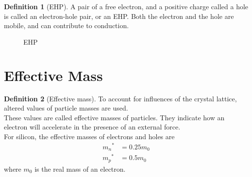 \documentclass[titlepage, fleqn, a4paper, 12pt, twoside]{article}
\theoremstyle{definition}
\newtheorem{definition}{Definition}
\theoremstyle{theorem}
\begin{document}
\begin{definition}[EHP]
	A pair of a free electron, and a positive charge called a hole is called an electron-hole pair, or an EHP.
	Both the electron and the hole are mobile, and can contribute to conduction.
	\begin{figure}[H]
		\centering
		\caption{EHP}
	\end{figure}
\end{definition}

\section{Effective Mass}

\begin{definition}[Effective mass]
	To account for influences of the crystal lattice, altered values of particle masses are used.\\
	These values are called effective masses of particles.
	They indicate how an electron will accelerate in the presence of an external force.\\
	For silicon, the effective masses of electrons and holes are
	\begin{align*}
		{m_n}^* &= 0.25 m_0\\
		{m_p}^* &= 0.5 m_0
	\end{align*}
	where $m_0$ is the real mass of an electron.
\end{definition}
\end{document}
